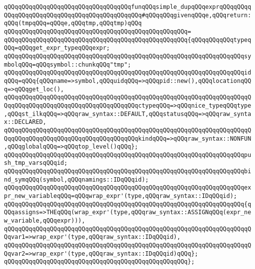 \newline
\verb|qQQqqQQqqQQqqQQqqQQqqQQqqQQqqQQqqQQqfunqQQqsimple_dupqQQqexprqQQqqQQqqQQqqQQqqQQqqQQqqQQqqQQqqQQqqQQqqQQqqQQq#qQQqqQQqgivenqQQqe,qQQqreturn:qQQq(tmpqQQq=qQQqe,qQQqtmp,qQQqtmp)qQQq|\newline
\verb|qQQqqQQqqQQqqQQqqQQqqQQqqQQqqQQqqQQqqQQqqQQqqQQqqQQq=|\newline
\verb|qQQqqQQqqQQqqQQqqQQqqQQqqQQqqQQqqQQqqQQqqQQqqQQqqQQq{qQQqqQQqqQQqtypeqQQq=qQQqget_expr_typeqQQqexpr;|\newline
\verb|qQQqqQQqqQQqqQQqqQQqqQQqqQQqqQQqqQQqqQQqqQQqqQQqqQQqqQQqqQQqqQQqqQQqsymbolqQQq=qQQqsymbol::chunkqQQq"tmp";|\newline
\verb|qQQqqQQqqQQqqQQqqQQqqQQqqQQqqQQqqQQqqQQqqQQqqQQqqQQqqQQqqQQqqQQqqQQqidqQQq=qQQq{qQQqname=>symbol,qQQquidqQQq=>qQQqpid::new(),qQQqlocationqQQq=>qQQqget_loc(),|\newline
\verb|qQQqqQQqqQQqqQQqqQQqqQQqqQQqqQQqqQQqqQQqqQQqqQQqqQQqqQQqqQQqqQQqqQQqqQQqqQQqqQQqqQQqqQQqqQQqqQQqqQQqqQQqqQQqctypeqQQq=>qQQqnice_typeqQQqtype,qQQqst_ilkqQQq=>qQQqraw_syntax::DEFAULT,qQQqstatusqQQq=>qQQqraw_syntax::DECLARED,|\newline
\verb|qQQqqQQqqQQqqQQqqQQqqQQqqQQqqQQqqQQqqQQqqQQqqQQqqQQqqQQqqQQqqQQqqQQqqQQqqQQqqQQqqQQqqQQqqQQqqQQqqQQqqQQqqQQqkindqQQq=>qQQqraw_syntax::NONFUN,qQQqglobalqQQq=>qQQqtop_level()qQQq};|\newline
\verb|qQQqqQQqqQQqqQQqqQQqqQQqqQQqqQQqqQQqqQQqqQQqqQQqqQQqqQQqqQQqqQQqqQQqpush_tmp_varsqQQqid;|\newline
\verb|qQQqqQQqqQQqqQQqqQQqqQQqqQQqqQQqqQQqqQQqqQQqqQQqqQQqqQQqqQQqqQQqqQQqbind_symqQQq(symbol,qQQqnamings::IDqQQqid);|\newline
\verb|qQQqqQQqqQQqqQQqqQQqqQQqqQQqqQQqqQQqqQQqqQQqqQQqqQQqqQQqqQQqqQQqqQQqexpr_new_variableqQQq=qQQqwrap_expr'(type,qQQqraw_syntax::IDqQQqid);|\newline
\newline
\verb|qQQqqQQqqQQqqQQqqQQqqQQqqQQqqQQqqQQqqQQqqQQqqQQqqQQqqQQqqQQqqQQqqQQq{qQQqassigns=>THEqQQq(wrap_expr'(type,qQQqraw_syntax::ASSIGNqQQq(expr_new_variable,qQQqexpr))),|\newline
\verb|qQQqqQQqqQQqqQQqqQQqqQQqqQQqqQQqqQQqqQQqqQQqqQQqqQQqqQQqqQQqqQQqqQQqqQQqvar1=>wrap_expr'(type,qQQqraw_syntax::IDqQQqid),|\newline
\verb|qQQqqQQqqQQqqQQqqQQqqQQqqQQqqQQqqQQqqQQqqQQqqQQqqQQqqQQqqQQqqQQqqQQqqQQqvar2=>wrap_expr'(type,qQQqraw_syntax::IDqQQqid)qQQq};|\newline
\verb|qQQqqQQqqQQqqQQqqQQqqQQqqQQqqQQqqQQqqQQqqQQqqQQqqQQq};|\newline
